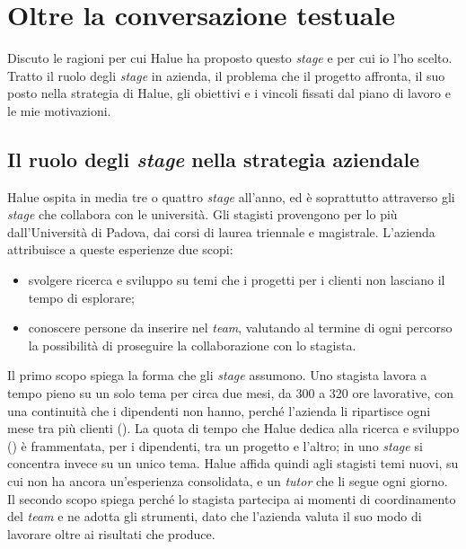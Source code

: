 
\chapter{Oltre la conversazione testuale}

Discuto le ragioni per cui Halue ha proposto questo \emph{stage} e per cui io l’ho scelto. Tratto
il ruolo degli \emph{stage} in azienda, il problema che il progetto affronta, il suo posto nella
strategia di Halue, gli obiettivi e i vincoli fissati dal piano di lavoro e le mie motivazioni.

\section{Il ruolo degli \emph{stage} nella strategia aziendale}
\label{sec:stage-strategia}

Halue ospita in media tre o quattro \emph{stage} all’anno, ed è soprattutto attraverso gli
\emph{stage} che collabora con le università. Gli stagisti provengono per lo più dall’Università di
Padova, dai corsi di laurea triennale e magistrale. L’azienda attribuisce a queste esperienze due
scopi:

\begin{itemize}
	\item svolgere ricerca e sviluppo su temi che i progetti per i clienti non lasciano il tempo di
	esplorare;
	\item conoscere persone da inserire nel \emph{team}, valutando al termine di ogni percorso la
	possibilità di proseguire la collaborazione con lo stagista.
\end{itemize}

Il primo scopo spiega la forma che gli \emph{stage} assumono. Uno stagista lavora a tempo pieno su
un solo tema per circa due mesi, da 300 a 320 ore lavorative, con una continuità che i dipendenti
non hanno, perché l’azienda li ripartisce ogni mese tra più clienti
(). La quota di tempo che Halue dedica alla ricerca e sviluppo
() è frammentata, per i dipendenti, tra un progetto e l’altro; in uno
\emph{stage} si concentra invece su un unico tema. Halue affida quindi agli stagisti temi nuovi, su
cui non ha ancora un’esperienza consolidata, e un \emph{tutor} che li segue ogni giorno. Il secondo
scopo spiega perché lo stagista partecipa ai momenti di coordinamento del \emph{team} e ne adotta gli
strumenti, dato che l’azienda valuta il suo modo di lavorare oltre ai risultati che produce.

